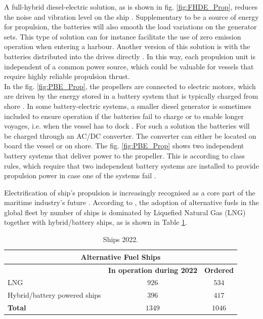 A full-hybrid diesel-electric solution, as is shown in fig. \ref{fig:FHDE_Prop}, reduces the noise and vibration level on the ship \cite{EMSA}. Supplementary to be a source of energy for propulsion, the batteries will also smooth the load variations on the generator sets. This type of solution can for instance facilitate the use of zero emission operation when entering a harbour. Another version of this solution is with the batteries distributed into the drives directly \cite{EMSA}. In this way, each propulsion unit is independent of a common power source, which could be valuable for vessels that require highly reliable propulsion thrust.\\

In the fig. \ref{fig:PBE_Prop}, the propellers are connected to electric motors, which are driven by the energy stored in a battery system that is typically charged from shore \cite{MAN}. In some battery-electric systems, a smaller diesel generator is sometimes included to ensure operation if the batteries fail to charge or to enable longer voyages, i.e. when the vessel has to dock \cite{MAN}. For such a solution the batteries will be charged through an AC/DC converter. The converter can either be located on board the vessel or on shore. The fig. \ref{fig:PBE_Prop} shows two independent battery systems that deliver power to the propeller. This is according to class rules, which require that two independent battery systems are installed to provide propulsion power in case one of the systems fail \cite{EMSA}.

Electrification of ship's propulsion is increasingly recognised as a core part of the maritime industry's future \cite{Marcin}. According to \cite{DNV}, the adoption of alternative fuels in the global fleet by number of ships is dominated by Liquefied Natural Gas (LNG) together with hybrid/battery ships, as is shown in Table \ref{tab:Ships2022}.


\begin{table}[H]
\centering
\caption{Ships 2022.}
\label{tab:Ships2022}
\begin{tabular}{p{30mm}|c|c}
\hline
\multicolumn{3}{|c|}{\textbf{Alternative Fuel Ships}} \\
\hline\hline
&\textbf{In operation during 2022} & \textbf{Ordered} \\
\hline
LNG & $926$ & $534$ \\
\hline
Hybrid/battery powered ships & $396$ & $417$ \\
\hline
\textbf{Total} & $1349$ & $1046$ \\
\hline \hline
\end{tabular}
\end{table}	

